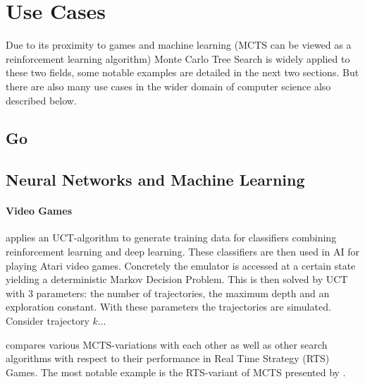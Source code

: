 \section{Use Cases}
\label{sec:use_cases}
Due to its proximity to games and machine learning (MCTS can be viewed as a reinforcement learning algorithm) Monte Carlo Tree Search is widely applied to these two fields, some notable examples are detailed in the next two sections. But there are also many use cases in the wider domain of computer science also described below.
\subsection{Go}
\cite{silver2017mastering}
\subsection{Neural Networks and Machine Learning}
\paragraph{Video Games} 
\cite{guo2014deep} applies an UCT-algorithm \cite{kocsis2006bandit} to generate training data for classifiers combining reinforcement learning and deep learning. These classifiers are then used in AI for playing Atari video games. Concretely the emulator is accessed at a certain state yielding a deterministic Markov Decision Problem. This is then solved by UCT with 3 parameters: the number of trajectories, the maximum depth and an exploration constant. With these parameters the trajectories are simulated. Consider trajectory $k$...

\cite{stanescu2016evaluating} compares various MCTS-variations with each other as well as other search algorithms with respect to their performance in Real Time Strategy (RTS) Games. The most notable example is the RTS-variant of MCTS presented by \cite{ontanon2013combinatorial} .
